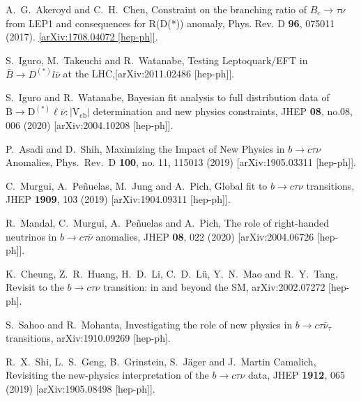 \documentclass[reprint,showpacs,aps,prd,nofootinbib,superscriptaddress,longbibliography]{revtex4-1}
\begin{document}
\begin{thebibliography}{99}
A.~G.~Akeroyd and C.~H.~Chen, Constraint on the branching ratio of $B_c \to \tau \nu$ from LEP1 and consequences for R(D(*)) anomaly, Phys. Rev. D \textbf{96}, 075011 (2017). \href{http://arxiv.org/abs/1708.04072}{[arXiv:1708.04072 [hep-ph]]}.


S.~Iguro, M.~Takeuchi and R.~Watanabe, Testing Leptoquark/EFT in $\bar B \to D^{(*)} l\bar\nu$ at the LHC,[arXiv:2011.02486 [hep-ph]].

S.~Iguro and R.~Watanabe, Bayesian fit analysis to full distribution data of $ \overline{\mathrm{B}}\to {\mathrm{D}}^{\left(\ast \right)}\mathrm{\ell}\overline{\nu }:\left|{\mathrm{V}}_{\mathrm{cb}}\right| $ determination and new physics constraints, JHEP \textbf{08}, no.08, 006 (2020)
[arXiv:2004.10208 [hep-ph]].

  P.~Asadi and D.~Shih,
  Maximizing the Impact of New Physics in $b\rightarrow c \tau \nu$ Anomalies, Phys.\ Rev.\ D {\bf 100}, no. 11, 115013 (2019)
  [arXiv:1905.03311 [hep-ph]].

  C.~Murgui, A.~Peñuelas, M.~Jung and A.~Pich, Global fit to $b \to c \tau \nu$ transitions, JHEP {\bf 1909}, 103 (2019)
  [arXiv:1904.09311 [hep-ph]].

R.~Mandal, C.~Murgui, A.~Peñuelas and A.~Pich, The role of right-handed neutrinos in $b \to c \tau \bar{\nu}$ anomalies, JHEP \textbf{08}, 022 (2020)
[arXiv:2004.06726 [hep-ph]].

  K.~Cheung, Z.~R.~Huang, H.~D.~Li, C.~D.~Lü, Y.~N.~Mao and R.~Y.~Tang,
  Revisit to the $b\to c\tau\nu$ transition: in and beyond the SM,
  arXiv:2002.07272 [hep-ph].
  
  S.~Sahoo and R.~Mohanta, Investigating the role of new physics in $b \to c \tau \bar \nu_\tau$ transitions,
  arXiv:1910.09269 [hep-ph].

  R.~X.~Shi, L.~S.~Geng, B.~Grinstein, S.~Jäger and J.~Martin Camalich, Revisiting the new-physics interpretation of the $b\to c\tau\nu$ data, JHEP {\bf 1912}, 065 (2019)
  [arXiv:1905.08498 [hep-ph]].
  

\end{thebibliography}
\end{document}
